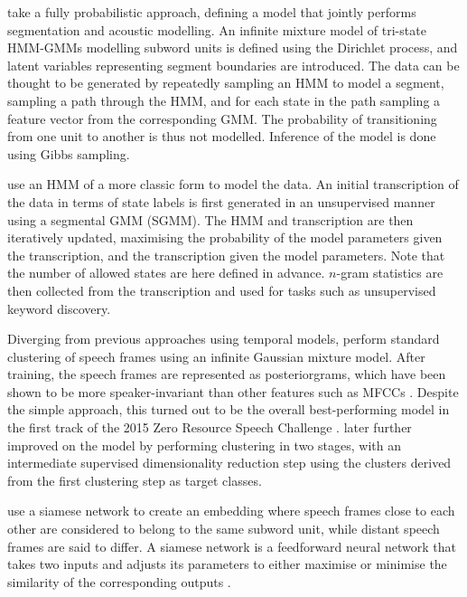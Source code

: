 \textcite{lee2012nonparametric} take a fully probabilistic approach, defining a model that jointly performs segmentation and acoustic modelling.
An infinite mixture model of tri-state HMM-GMMs modelling subword units is defined using the Dirichlet process, and latent variables representing segment boundaries are introduced.
The data can be thought to be generated by repeatedly sampling an HMM to model a segment, sampling a path through the HMM, and for each state in the path sampling a feature vector from the corresponding GMM.
The probability of transitioning from one unit to another is thus not modelled.
Inference of the model is done using Gibbs sampling.

\textcite{siu2014unsupervised} use an HMM of a more classic form to model the data.
An initial transcription of the data in terms of state labels is first generated in an unsupervised manner using a segmental GMM (SGMM).
The HMM and transcription are then iteratively updated, maximising the probability of the model parameters given the transcription, and the transcription given the model parameters.
Note that the number of allowed states are here defined in advance.
$n$-gram statistics are then collected from the transcription and used for tasks such as unsupervised keyword discovery.

Diverging from previous approaches using temporal models, \textcite{chen2015parallel} perform standard clustering of speech frames using an infinite Gaussian mixture model.
After training, the speech frames are represented as posteriorgrams, which have been shown to be more speaker-invariant than other features such as MFCCs \parencite{zhang2010towards}.
Despite the simple approach, this turned out to be the overall best-performing model in the first track of the 2015 Zero Resource Speech Challenge \parencite{versteegh2016zero}.
\textcite{heck2016unsupervised} later further improved on the model by performing clustering in two stages, with an intermediate supervised dimensionality reduction step using the clusters derived from the first clustering step as target classes.

\textcite{synnaeve2016temporal} use a siamese network to create an embedding where speech frames close to each other are considered to belong to the same subword unit, while distant speech frames are said to differ.
A siamese network is a feedforward neural network that takes two inputs and adjusts its parameters to either maximise or minimise the similarity of the corresponding outputs \parencite{bromley1994signature}.


